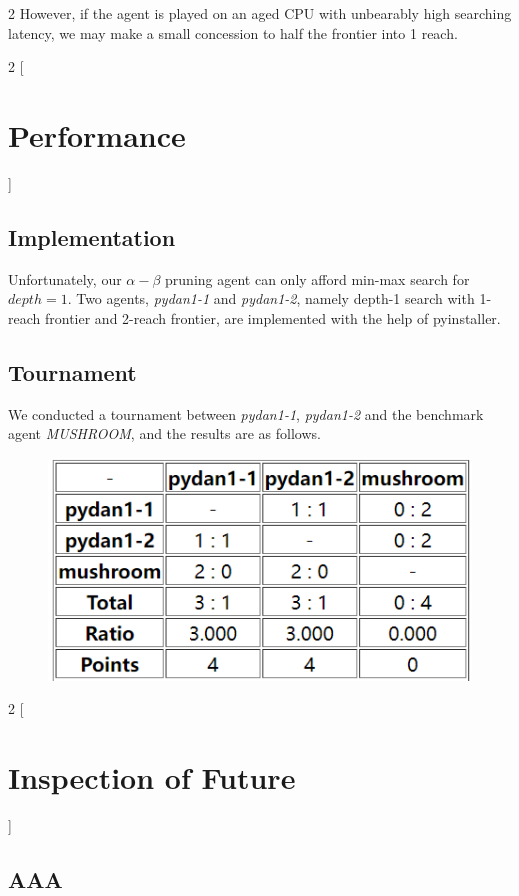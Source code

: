 \documentclass[a4paper, 11pt]{article} %
\begin{document}
\begin{multicols}{2}
    However, if the agent is played on an aged CPU with unbearably high searching latency, we may make a small concession to half the frontier into 1 reach. 

\end{multicols}

\begin{multicols}{2}
	 [
		\section{Performance}
	]
	\subsection{Implementation}
	Unfortunately, our $\alpha-\beta$ pruning agent can only afford min-max search for $depth=1$. Two agents, \textit{pydan1-1} and \textit{pydan1-2}, namely depth-1 search with 1-reach frontier and 2-reach frontier, are implemented with the help of pyinstaller. 
	
	\subsection{Tournament}
	We conducted a tournament between \textit{pydan1-1}, \textit{pydan1-2} and the benchmark agent \textit{MUSHROOM}, and the results are as follows.
	\begin{figure}[H]
		\centering
		\parbox{1\linewidth}{
			\includegraphics[width=\linewidth]{results.png}
		}

	\end{figure}
\end{multicols}

\begin{multicols}{2}
	[
	\section{Inspection of Future}
	]
	\subsection{AAA}
\end{multicols}
\end{document}

